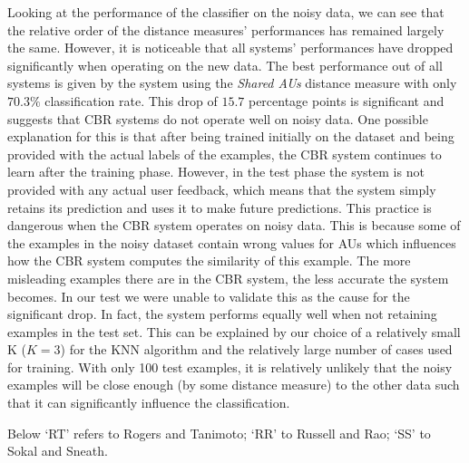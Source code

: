 \documentclass[10pt,a4paper]{article}
\begin{document}
Looking at the performance of the classifier on the noisy data, we can see that the relative order of the distance measures' performances has remained largely the same. However, it is noticeable that all systems' performances have dropped significantly when operating on the new data. The best performance out of all systems is given by the system using the \emph{Shared AUs} distance measure with only $70.3\%$ classification rate. This drop of $15.7$ percentage points is significant and suggests that CBR systems do not operate well on noisy data.
One possible explanation for this is that after being trained initially on the dataset and being provided with the actual labels of the examples, the CBR system continues to learn after the training phase. However, in the test phase the system is not provided with any actual user feedback, which means that the system simply retains its prediction and uses it to make future predictions. This practice is dangerous when the CBR system operates on noisy data. This is because some of the examples in the noisy dataset contain wrong values for AUs which influences how the CBR system computes the similarity of this example. The more misleading examples there are in the CBR system, the less accurate the system becomes. In our test we were unable to validate this as the cause for the significant drop. In fact, the system performs equally well when not retaining examples in the test set. This can be explained by our choice of a relatively small K ($K=3$) for the KNN algorithm and the relatively large number of cases used for training. With only 100 test examples, it is relatively unlikely that the noisy examples will be close enough (by some distance measure) to the other data such that it can significantly influence the classification.

Below `RT' refers to Rogers and Tanimoto; `RR' to Russell and Rao; `SS' to Sokal and Sneath.
\end{document}
